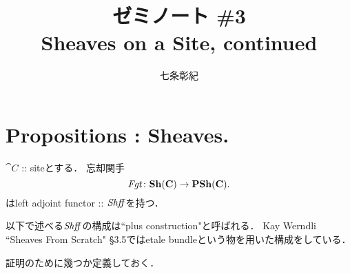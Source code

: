 \documentclass[a4paper, dvipdfmx]{jsarticle}
\begin{document}
\title{ゼミノート \#3 \\ Sheaves on a Site, continued}
\author{七条彰紀}
\maketitle

\section{Propositions : Sheaves.}
\begin{Thm}\label{thm:Shff}
    $\cat{C}$ :: siteとする．
    忘却関手
    \[ \mathit{Fgt} \colon \mathbf{Sh}(\mathbf{C}) \to \mathbf{PSh}(\mathbf{C}). \]
    はleft adjoint functor :: $\mathit{Shff}$を持つ．
\end{Thm}
\begin{Remark}
    以下で述べる$\mathit{Shff}$の構成は``plus construction"と呼ばれる．
    Kay Werndli ``Sheaves From Scratch" \S3.5ではetale bundleという物を用いた構成をしている．
\end{Remark}

証明のために幾つか定義しておく．
\end{document}
